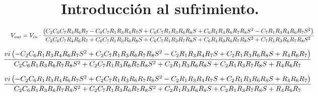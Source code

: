 \documentclass[a4paper]{article}
\begin{document}
\section{Introducción al sufrimiento.}


\begin{equation}
\hspace{-3cm}
V_{out} = V_{in} \cdot \frac{\left(C_{2} C_{6} C_{7} R_{4} R_{6} R_{7} - C_{6} C_{7} R_{1} R_{3} R_{4} R_{7} S + C_{6} C_{7} R_{1} R_{3} R_{6} R_{8} S + C_{6} R_{1} R_{3} R_{6} R_{7} R_{8} S^{2} - C_{7} R_{1} R_{3} R_{4} R_{6} R_{7} S^{2}\right)}{C_{2} C_{6} C_{7} R_{4} R_{6} R_{7} + C_{6} C_{7} R_{1} R_{3} R_{6} R_{8} S + C_{6} C_{7} R_{1} R_{3} R_{7} R_{8} S + C_{6} R_{1} R_{3} R_{6} R_{7} R_{8} S^{2} + C_{7} R_{1} R_{3} R_{6} R_{7} R_{8} S^{2}}
\end{equation}

\begin{equation}
\hspace{-3cm}
\frac{vi \left(- C_{2} C_{6} R_{1} R_{3} R_{4} R_{6} R_{7} S^{2} + C_{2} C_{7} R_{1} R_{3} R_{6} R_{7} R_{8} S^{2} - C_{2} R_{1} R_{3} R_{4} R_{7} S + C_{2} R_{1} R_{3} R_{6} R_{8} S + R_{4} R_{6} R_{7}\right)}{C_{2} C_{6} R_{1} R_{3} R_{6} R_{7} R_{8} S^{2} + C_{2} C_{7} R_{1} R_{3} R_{6} R_{7} R_{8} S^{2} + C_{2} R_{1} R_{3} R_{6} R_{8} S + C_{2} R_{1} R_{3} R_{7} R_{8} S + R_{4} R_{6} R_{7}}
\end{equation}

\begin{equation}
\hspace{-3cm}
\frac{vi \left(- C_{2} C_{6} R_{1} R_{3} R_{4} R_{6} R_{7} S^{2} + C_{2} C_{7} R_{1} R_{3} R_{6} R_{7} R_{8} S^{2} - C_{2} R_{1} R_{3} R_{4} R_{7} S + C_{2} R_{1} R_{3} R_{6} R_{8} S + R_{4} R_{6} R_{7}\right)}{C_{2} C_{6} R_{1} R_{3} R_{6} R_{7} R_{8} S^{2} + C_{2} C_{7} R_{1} R_{3} R_{6} R_{7} R_{8} S^{2} + C_{2} R_{1} R_{3} R_{6} R_{8} S + C_{2} R_{1} R_{3} R_{7} R_{8} S + R_{4} R_{6} R_{7}}
\end{equation}
\end{document}
